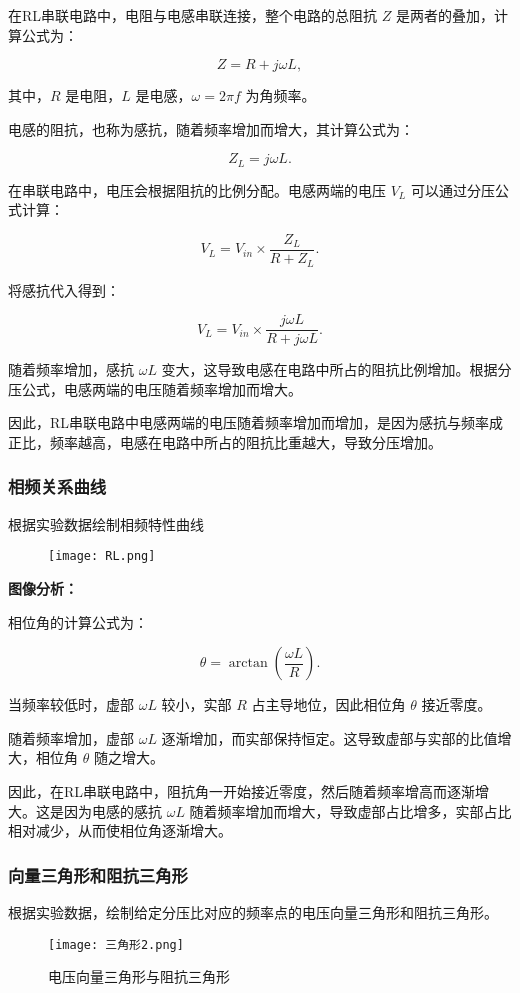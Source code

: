 \documentclass[dvipsnames, svgnames,a4paper,11pt]{article}
\begin{document}
在RL串联电路中，电阻与电感串联连接，整个电路的总阻抗 \( Z \) 是两者的叠加，计算公式为：

\[
Z = R + j\omega L,
\]

其中，\( R \) 是电阻，\( L \) 是电感，\( \omega = 2\pi f \) 为角频率。

电感的阻抗，也称为感抗，随着频率增加而增大，其计算公式为：

\[
Z_L = j\omega L.
\]

在串联电路中，电压会根据阻抗的比例分配。电感两端的电压 \( V_L \) 可以通过分压公式计算：

\[
V_L = V_{in} \times \frac{Z_L}{R + Z_L}.
\]

将感抗代入得到：

\[
V_L = V_{in} \times \frac{j\omega L}{R + j\omega L}.
\]

随着频率增加，感抗 \( \omega L \) 变大，这导致电感在电路中所占的阻抗比例增加。根据分压公式，电感两端的电压随着频率增加而增大。

因此，RL串联电路中电感两端的电压随着频率增加而增加，是因为感抗与频率成正比，频率越高，电感在电路中所占的阻抗比重越大，导致分压增加。
\subsubsection{相频关系曲线}
根据实验数据绘制相频特性曲线
\begin{figure}[{H}]
	\centering
	\texttt{[image: RL.png]}
	
	\label{}
\end{figure}
\textbf{图像分析：}

相位角的计算公式为：

\[
\theta = \arctan\left( \frac{\omega L}{R} \right).
\]

当频率较低时，虚部 \( \omega L \) 较小，实部 \( R \) 占主导地位，因此相位角 \(\theta\) 接近零度。

随着频率增加，虚部 \( \omega L \) 逐渐增加，而实部保持恒定。这导致虚部与实部的比值增大，相位角 \(\theta\) 随之增大。

因此，在RL串联电路中，阻抗角一开始接近零度，然后随着频率增高而逐渐增大。这是因为电感的感抗 \( \omega L \) 随着频率增加而增大，导致虚部占比增多，实部占比相对减少，从而使相位角逐渐增大。
\subsubsection{向量三角形和阻抗三角形}
根据实验数据，绘制给定分压比对应的频率点的电压向量三角形和阻抗三角形。
\begin{figure}[{H}]
	\centering
	\texttt{[image: 三角形2.png]}
	\caption{电压向量三角形与阻抗三角形}
	\label{}
\end{figure}
\end{document}
